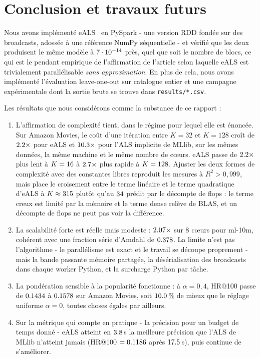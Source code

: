 
\section{Conclusion et travaux futurs}\label{sec:conclusion}

Nous avons implémenté eALS~\cite{he2016eals} en PySpark - une version RDD fondée sur
des broadcasts, adossée à une référence NumPy séquentielle - et vérifié que les deux
produisent le même modèle à $7\cdot 10^{-14}$ près, quel que soit le nombre de blocs, ce qui
est le pendant empirique de l'affirmation de l'article selon laquelle eALS est
trivialement parallélisable \emph{sans approximation}. En plus de cela, nous avons
implémenté l'évaluation leave-one-out sur catalogue entier et une campagne
expérimentale dont la sortie brute se trouve dans \texttt{results/*.csv}.

Les résultats que nous considérons comme la substance de ce rapport :

\begin{enumerate}\itemsep2pt
\item L'affirmation de complexité tient, dans le régime pour lequel elle est
énoncée. Sur Amazon Movies, le coût d'une itération entre $K=32$ et $K=128$ croît de
$2.2\times$ pour eALS et $10.3\times$ pour l'ALS implicite de
MLlib, sur les mêmes données, la même machine et le même nombre de cœurs. eALS passe
de $2.2\times$ plus lent à $K=16$ à $2.7\times$
plus rapide à $K=128$. Ajuster les deux formes de complexité avec des
constantes libres reproduit les mesures à $R^2>0,999$, mais place le croisement entre
le terme linéaire et le terme quadratique d'eALS à $K\approx315$ plutôt
qu'au $34$ prédit par le décompte de flops : le terme creux est limité par la
mémoire et le terme dense relève de BLAS, et un décompte de flops ne peut pas voir la
différence.
\item La scalabilité forte est réelle mais modeste : $2.07\times$ sur 8 cœurs
pour ml-10m, cohérent avec une fraction série d'Amdahl de $0.378$. La limite
n'est pas l'algorithme - le parallélisme est exact et le travail se découpe
proprement - mais la bande passante mémoire partagée, la désérialisation des
broadcasts dans chaque worker Python, et la surcharge Python par tâche.
\item La pondération sensible à la popularité fonctionne : à $\alpha=0,4$, HR@100
passe de $0.1434$ à $0.1578$ sur Amazon Movies, soit $10.0$\,\% de mieux que le
réglage uniforme $\alpha=0$, toutes choses égales par ailleurs.
\item Sur la métrique qui compte en pratique - la précision pour un budget de temps
donné - eALS atteint en $3.8$\,s la meilleure précision que l'ALS de
MLlib n'atteint jamais (HR@100 $=0.1186$ après $17.5$\,s), puis continue
de s'améliorer.
\end{enumerate}

